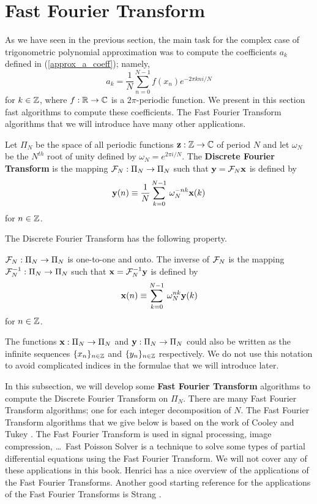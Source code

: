 \section{Fast Fourier Transform}

As we have seen in the previous section, the main task for the
complex case of trigonometric polynomial approximation was to compute
the coefficients $a_k$ defined in (\ref{approx_a_coeff}); namely,
\[
  a_k = \frac{1}{N} \sum_{n=0}^{N-1} f(x_n) e^{-2\pi k n i/N}
\]
for $k\in \mathbb{Z}$, where $f:\mathbb{R} \to \mathbb{C}$ is a $2\pi$-periodic function.
We present in this section fast algorithms to compute these coefficients.
The Fast Fourier Transform algorithms that we will introduce have many
other applications.

\begin{defn}
Let $\Pi_N$ be the space of all periodic functions
$\mathbf{z}:\mathbb{Z} \rightarrow \mathbb{C}$
of period $N$ and let $\omega_N$ be the $N^{th}$ root of unity defined by
$\omega_N = e^{2\pi i/N}$.  The
{\bfseries Discrete Fourier Transform}
is the mapping $\mathcal{F}_N: \Pi_N \rightarrow \Pi_N$ such that
$\mathbf{y} = \mathcal{F}_N \mathbf{x}$ is defined by
\[
\mathbf{y}(n) \equiv \frac{1}{N} \sum_{k=0}^{N-1} \, \omega_N^{-nk}
\mathbf{x}(k)
\]
for $n \in \mathbb{Z}$.
\end{defn}

The Discrete Fourier Transform has the following property.

\begin{prop}
$\mathcal{F}_N:\Pi_N \rightarrow \Pi_N$ is one-to-one and onto.  The inverse
of $\mathcal{F}_N$ is the mapping $\mathcal{F}_N^{-1}: \Pi_N \rightarrow \Pi_N$ such
that $\mathbf{x} = \mathcal{F}_N^{-1} \mathbf{y}$ is defined by
\[
\mathbf{x}(n) \equiv \sum_{k=0}^{N-1} \, \omega_N^{nk} \mathbf{y}(k)
\]
for $n \in \mathbb{Z}$.
\end{prop}

The functions $\mathbf{x}:\Pi_N\rightarrow \Pi_N$ and
$\mathbf{y}: \Pi_N\rightarrow \Pi_N$ could also be written as
the infinite sequences $\displaystyle \{x_n\}_{n\in\mathbb{Z}}$ and
$\displaystyle \{y_n\}_{n\in\mathbb{Z}}$ respectively.  We do not use this
notation to avoid complicated indices in the formulae that we will
introduce later.

In this subsection, we will develop some
{\bfseries Fast Fourier Transform}
algorithms to compute the Discrete
Fourier Transform on $\Pi_N$.  There are many Fast Fourier Transform
algorithms; one for each integer decomposition of $N$.  The Fast
Fourier Transform algorithms that we give below is based on the
work of Cooley and Tukey \cite{CT}.  The Fast Fourier Transform is
used in signal processing, image compression, \ldots\  Fast Poisson
Solver is a technique to solve some types of partial differential
equations using the Fast Fourier Transform.  We will not cover any of
these applications in this book.   Henrici \cite{He} has a nice
overview of the applications of the Fast Fourier Transforms.  Another good
starting reference for the applications of the Fast Fourier Transforms
is Strang \cite{St}.

